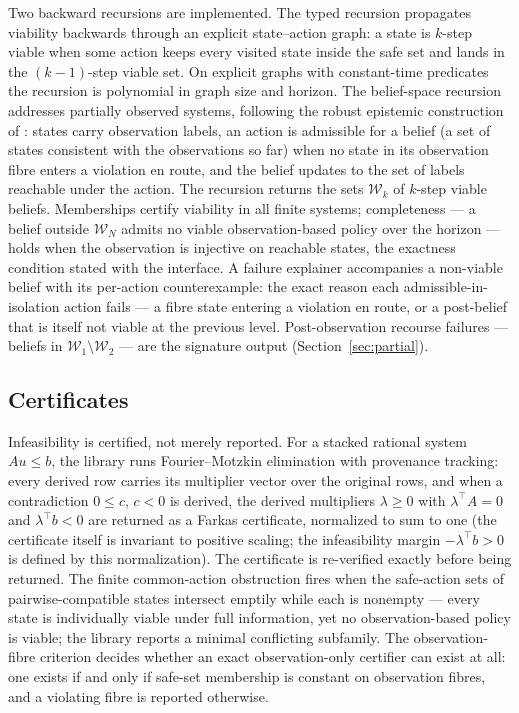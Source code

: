 \documentclass[3p,11pt]{elsarticle}
\begin{document}
Two backward recursions are implemented. The typed recursion propagates
viability backwards through an explicit state--action graph: a state is
$k$-step viable when some action keeps every visited state inside the safe
set and lands in the $(k-1)$-step viable set. On explicit graphs with
constant-time predicates the recursion is polynomial in graph size and
horizon. The belief-space recursion addresses partially observed systems,
following the robust epistemic construction of \citet{Abaee2026b}: states carry
observation labels, an action is admissible for a belief (a set of states
consistent with the observations so far) when no state in its observation
fibre enters a violation en route, and the belief updates to the set of
labels reachable under the action. The recursion returns the sets
$\mathcal{W}_k$ of $k$-step viable beliefs. Memberships certify viability in
all finite systems; completeness --- a belief outside $\mathcal{W}_N$ admits
no viable observation-based policy over the horizon --- holds when the
observation is injective on reachable states, the exactness condition stated
with the interface. A failure explainer accompanies a non-viable belief with
its per-action counterexample: the exact reason each admissible-in-isolation
action fails --- a fibre state entering a violation en route, or a
post-belief that is itself not viable at the previous level.
Post-observation recourse failures --- beliefs in
$\mathcal{W}_1 \setminus \mathcal{W}_2$ --- are the signature output
(Section~\ref{sec:partial}).

\subsection{Certificates}\label{sec:certificates}

Infeasibility is certified, not merely reported. For a stacked rational
system $A u \leq b$, the library runs Fourier--Motzkin elimination with
provenance tracking: every derived row carries its multiplier vector over
the original rows, and when a contradiction $0 \leq c$, $c < 0$ is derived,
the derived multipliers $\lambda \geq 0$ with $\lambda^{\top} A = 0$ and
$\lambda^{\top} b < 0$ are returned as a Farkas certificate, normalized to
sum to one (the certificate itself is invariant to positive scaling; the
infeasibility margin $-\lambda^{\top} b > 0$ is defined by this
normalization). The certificate is
re-verified exactly before being returned. The finite common-action
obstruction fires when the safe-action sets of pairwise-compatible states
intersect emptily while each is nonempty --- every state is individually
viable under full information, yet no observation-based policy is viable;
the library reports a minimal conflicting subfamily. The observation-fibre
criterion decides whether an exact observation-only certifier can exist at
all: one exists if and only if safe-set membership is constant on
observation fibres, and a violating fibre is reported otherwise.
\end{document}
